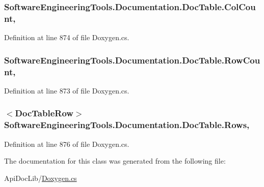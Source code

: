 \hypertarget{class_software_engineering_tools_1_1_documentation_1_1_doc_table_a66bdd113fc822da038a8aa8b5268436d}{
\subsubsection[{Col\+Count}]{ Software\+Engineering\+Tools.\+Documentation.\+Doc\+Table.\+Col\+Count\hspace{0.3cm}{\ttfamily [get]}, {\ttfamily [set]}}}\label{class_software_engineering_tools_1_1_documentation_1_1_doc_table_a66bdd113fc822da038a8aa8b5268436d}


Definition at line 874 of file Doxygen.\+cs.

\hypertarget{class_software_engineering_tools_1_1_documentation_1_1_doc_table_a3cacca0fb8c937d9de2c1e9f9527af0e}{
\subsubsection[{Row\+Count}]{ Software\+Engineering\+Tools.\+Documentation.\+Doc\+Table.\+Row\+Count\hspace{0.3cm}{\ttfamily [get]}, {\ttfamily [set]}}}\label{class_software_engineering_tools_1_1_documentation_1_1_doc_table_a3cacca0fb8c937d9de2c1e9f9527af0e}


Definition at line 873 of file Doxygen.\+cs.

\hypertarget{class_software_engineering_tools_1_1_documentation_1_1_doc_table_a5da78858e249a4869f87f771bb2c50cf}{
\subsubsection[{Rows}]{$<${\bf Doc\+Table\+Row}$>$ Software\+Engineering\+Tools.\+Documentation.\+Doc\+Table.\+Rows\hspace{0.3cm}{\ttfamily [get]}, {\ttfamily [set]}}}\label{class_software_engineering_tools_1_1_documentation_1_1_doc_table_a5da78858e249a4869f87f771bb2c50cf}


Definition at line 876 of file Doxygen.\+cs.



The documentation for this class was generated from the following file\+:\begin{DoxyCompactItemize}
\item 
Api\+Doc\+Lib/\hyperlink{_doxygen_8cs}{Doxygen.\+cs}\end{DoxyCompactItemize}

